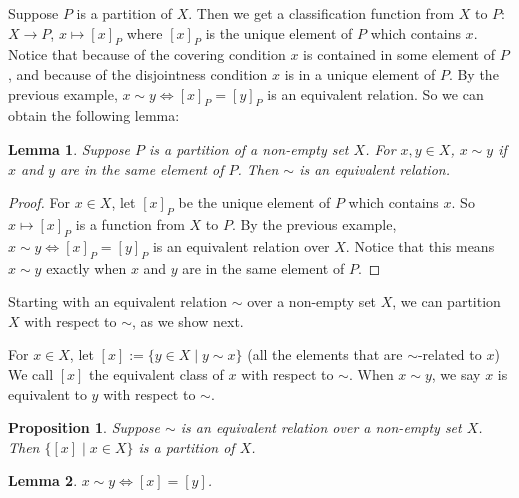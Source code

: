 \documentclass{article}
\theoremstyle{plain}
\newtheorem{lemma}{Lemma}
\newtheorem{proposition}{Proposition}
\theoremstyle{definition}
\begin{document}
Suppose $P$ is a partition of $X$. Then we get a classification function
from $X$ to $P$: $X\to P$, $x\mapsto [x]_P$ where $[x]_P$ is the 
unique element of $P$ which contains $x$. Notice that because of
the covering condition $x$ is contained in some element of $P$,
and because of the disjointness condition $x$ is in a unique
element of $P$. By the previous example, $x\sim y\Leftrightarrow [x]_P=[y]_P$
is an equivalent relation. So we can obtain the following lemma:

\begin{lemma}
    Suppose $P$ is a partition of a non-empty set $X$.
    For $x,y\in X$, $x\sim y$ if $x$ and $y$ are in the same element
    of $P$. Then $\sim$ is an equivalent relation.
\end{lemma}

\begin{proof}
    For $x\in X$, let $[x]_P$ be the unique element of $P$
    which contains $x$. So $x\mapsto[x]_P$ is a function from $X$
    to $P$. By the previous example, $x\sim y\Leftrightarrow[x]_P=[y]_P$
    is an equivalent relation over $X$. Notice that this means 
    $x\sim y$ exactly when $x$ and $y$ are in the same element of $P$.
\end{proof}

Starting with an equivalent relation $\sim$ over a non-empty
set $X$, we can partition $X$ with respect to $\sim$,
as we show next.

For $x\in X$, let $[x]:=\{y\in X\mid y\sim x\}$ (all the elements
that are $\sim$-related to $x$) We call $[x]$ the equivalent class
of $x$ with respect to $\sim$. When $x\sim y$, we say $x$ is equivalent to
$y$ with respect to $\sim$.

\begin{proposition}
    Suppose $\sim$ is an equivalent relation over a non-empty
    set $X$. Then $\{[x]\mid x\in X\}$ is a partition of $X$.
\end{proposition}

\begin{lemma}
    $x\sim y\Leftrightarrow [x]=[y]$.
\end{lemma}
\end{document}
